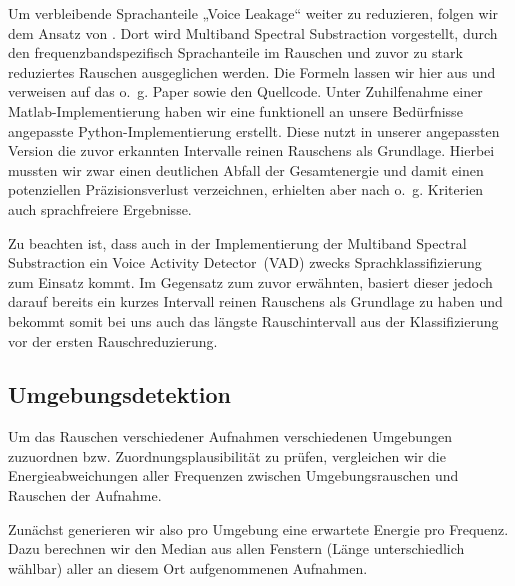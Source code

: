\documentclass[
	fontsize=10.5pt,
	marginpar=false,
	ngerman,
	accentcolor=3d
	]{tudapub}
\begin{document}
Um verbleibende Sprachanteile „Voice Leakage“ weiter zu reduzieren, folgen wir dem Ansatz von \cite{kamath_multi-band_2002}. Dort wird Multiband Spectral Substraction vorgestellt, durch den frequenzbandspezifisch Sprachanteile im Rauschen und zuvor zu stark reduziertes Rauschen ausgeglichen werden. Die Formeln lassen wir hier aus und verweisen auf das o.~g. Paper sowie den Quellcode. Unter Zuhilfenahme einer Matlab-Implementierung \cite{zavarehei_multi-band_nodate} haben wir eine funktionell an unsere Bedürfnisse angepasste Python-Implementierung erstellt. Diese nutzt in unserer angepassten Version die zuvor erkannten Intervalle reinen Rauschens als Grundlage. Hierbei mussten wir zwar einen deutlichen Abfall der Gesamtenergie und damit einen potenziellen Präzisionsverlust verzeichnen, erhielten aber nach o.~g. Kriterien auch sprachfreiere Ergebnisse.

Zu beachten ist, dass auch in der Implementierung der Multiband Spectral Substraction ein Voice Activity Detector~(VAD) zwecks Sprachklassifizierung zum Einsatz kommt. Im Gegensatz zum zuvor erwähnten, basiert dieser jedoch darauf bereits ein kurzes Intervall reinen Rauschens als Grundlage zu haben und bekommt somit bei uns auch das längste Rauschintervall aus der Klassifizierung vor der ersten Rauschreduzierung.

\pagebreak
\subsection{Umgebungsdetektion}
\label{envdetect}

Um das Rauschen verschiedener Aufnahmen verschiedenen Umgebungen zuzuordnen bzw. Zuordnungsplausibilität zu prüfen, vergleichen wir die Energieabweichungen aller Frequenzen zwischen Umgebungsrauschen und Rauschen der Aufnahme.

Zunächst generieren wir also pro Umgebung eine erwartete Energie pro Frequenz. Dazu berechnen wir den Median aus allen Fenstern (Länge unterschiedlich wählbar) aller an diesem Ort aufgenommenen Aufnahmen.
\end{document}
